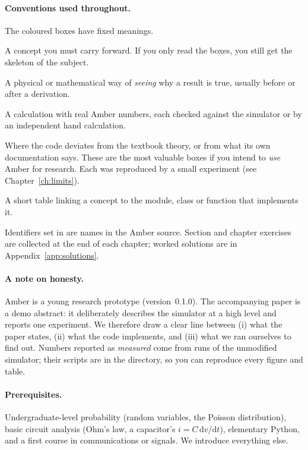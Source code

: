 \paragraph{Conventions used throughout.}
The coloured boxes have fixed meanings.
\begin{keyidea}
A concept you must carry forward. If you only read the boxes, you still get the skeleton of the subject.
\end{keyidea}
\begin{intuition}
A physical or mathematical way of \emph{seeing} why a result is true, usually before or after a derivation.
\end{intuition}
\begin{example}
A calculation with real Amber numbers, each checked against the simulator or by an independent hand calculation.
\end{example}
\begin{reality}
Where the code deviates from the textbook theory, or from what its own documentation says. These are the most valuable boxes if you intend to \emph{use} Amber for research. Each was reproduced by a small experiment (see Chapter~\ref{ch:limits}).
\end{reality}
\begin{codemap}
A short table linking a concept to the module, class or function that implements it.
\end{codemap}
Identifiers set in  are names in the Amber source. Section
and chapter exercises are collected at the end of each chapter; worked
solutions are in Appendix~\ref{app:solutions}.

\paragraph{A note on honesty.}
Amber is a young research prototype (version~0.1.0). The accompanying paper is
a demo abstract: it deliberately describes the simulator at a high level and
reports one experiment. We therefore draw a clear line between (i) what the
paper states, (ii) what the code implements, and (iii) what we ran ourselves
to find out. Numbers reported as \emph{measured} come from runs of the
unmodified simulator; their scripts are in the 
directory, so you can reproduce every figure and table.

\paragraph{Prerequisites.}
Undergraduate-level probability (random variables, the Poisson distribution),
basic circuit analysis (Ohm's law, a capacitor's $i=C\,\mathrm{d}v/\mathrm{d}t$),
elementary Python, and a first course in communications or signals. We
introduce everything else.


